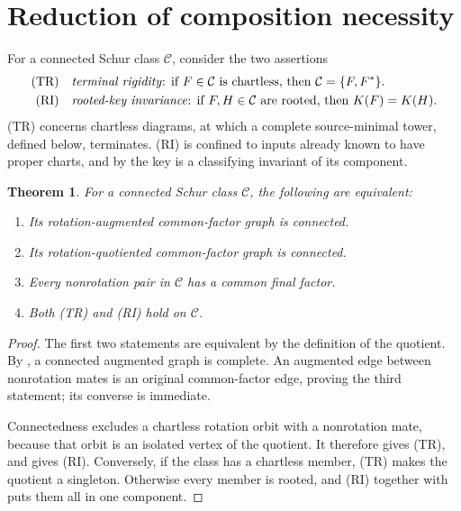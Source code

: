 \documentclass[11pt,a4paper]{amsart}
\numberwithin{equation}{section}
\theoremstyle{plain}
\newtheorem{theorem}{Theorem}[section]
\theoremstyle{definition}
\begin{document}
\section{Reduction of composition necessity}\label{sec:necessity-reduction}

For a connected Schur class \(\mathcal C\), consider the two assertions
\begin{align*}
 \mathrm{(TR)}\quad&\text{\emph{terminal rigidity}: if \(F\in\mathcal C\) is chartless, then \(\mathcal C=\{F,F^*\}\).}\\
 \mathrm{(RI)}\quad&\text{\emph{rooted-key invariance}: if \(F,H\in\mathcal C\) are rooted, then \(K(F)=K(H)\).}
\end{align*}
(TR) concerns chartless diagrams, at which a complete source-minimal tower, defined below, terminates.  (RI) is confined to inputs already known to have proper charts, and by  the key is a classifying invariant of its component.

\begin{theorem}\label{thm:connectivity-reduction}
For a connected Schur class \(\mathcal C\), the following are equivalent:
\begin{enumerate}
\item Its rotation-augmented common-factor graph is connected.
\item Its rotation-quotiented common-factor graph is connected.
\item Every nonrotation pair in \(\mathcal C\) has a common final factor.
\item Both (TR) and (RI) hold on \(\mathcal C\).
\end{enumerate}
\end{theorem}
\begin{proof}
The first two statements are equivalent by the definition of the quotient.  By , a connected augmented graph is complete.  An augmented edge between nonrotation mates is an original common-factor edge, proving the third statement; its converse is immediate.

Connectedness excludes a chartless rotation orbit with a nonrotation mate, because that orbit is an isolated vertex of the quotient.  It therefore gives (TR), and  gives (RI).  Conversely, if the class has a chartless member, (TR) makes the quotient a singleton.  Otherwise every member is rooted, and (RI) together with  puts them all in one component.
\end{proof}
\end{document}
